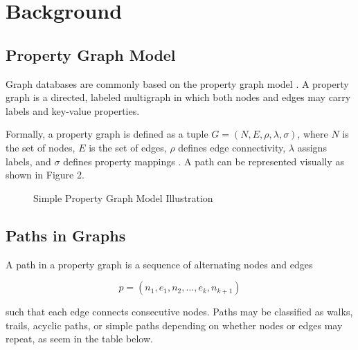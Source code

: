 \section{Background}

\subsection{Property Graph Model}

Graph databases are commonly based on the property graph model \cite{angles2018property}. A property graph is a directed, labeled multigraph in which both nodes and edges may carry labels and key-value properties.

Formally, a property graph is defined as a tuple
$G = (N, E, \rho, \lambda, \sigma)$,
where $N$ is the set of nodes, $E$ is the set of edges, $\rho$ defines edge connectivity, $\lambda$ assigns labels, and $\sigma$ defines property mappings \cite{angles2018property}. A path can be represented visually as shown in Figure 2.

\begin{figure}[ht]
    \centering
    \caption{Simple Property Graph Model Illustration}
\end{figure}

\subsection{Paths in Graphs}

A path in a property graph is a sequence of alternating nodes and edges

\[
p = (n_1, e_1, n_2, \dots, e_k, n_{k+1})
\]

such that each edge connects consecutive nodes. Paths may be classified as walks, trails, acyclic paths, or simple paths depending on whether nodes or edges may repeat, as seem in the table below.

